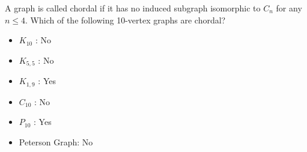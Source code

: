 \documentclass[12pt]{article}
\newenvironment{question}[2][Question]{\begin{trivlist}
\item[\hskip \labelsep {\bfseries #1}\hskip \labelsep {\bfseries #2.}]}{\end{trivlist}}
\begin{document}
\begin{question}{7}
A graph is called chordal if it has no induced subgraph isomorphic to $C_{n}$ for any $n \leq 4$. Which of the following 10-vertex graphs are chordal?
\end{question}

\begin{itemize}
\item $K_{10}$ \hspace{3mm}: No
\item $K_{5,5}$ \hspace{2mm}: No
\item $K_{1,9}$ \hspace{2mm}: Yes
\item $C_{10}$ \hspace{3mm}: No
\item $P_{10}$ \hspace{3mm}: Yes
\item Peterson Graph: No
\end{itemize}

\begin{align*}  
\end{align*}
 
 
\end{document}
